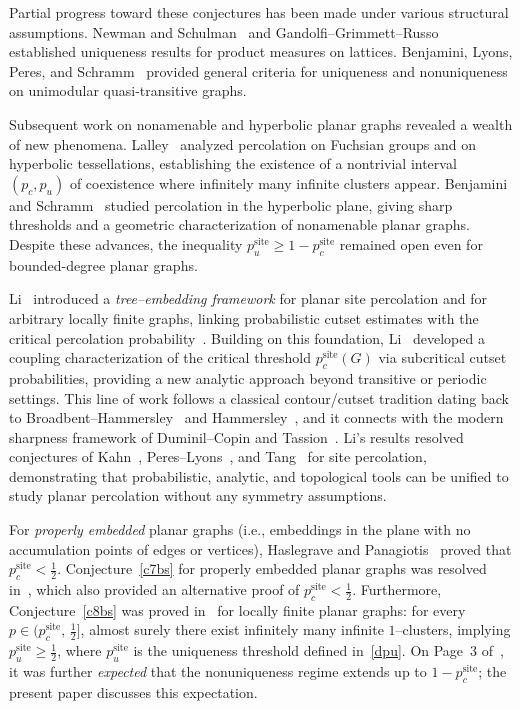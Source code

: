 \documentclass[11pt]{amsart}
\theoremstyle{plain}
\numberwithin{equation}{section}
\numberwithin{figure}{section}
\begin{document}
\medskip
Partial progress toward these conjectures has been made under various structural assumptions.
Newman and Schulman~\cite{NewmanSchulman1981}
and Gandolfi--Grimmett--Russo~\cite{GGR1988}
established uniqueness results for product measures on lattices.
Benjamini, Lyons, Peres, and Schramm~\cite{BLPS1999}
provided general criteria for uniqueness and nonuniqueness
on unimodular quasi-transitive graphs.

Subsequent work on nonamenable and hyperbolic planar graphs
revealed a wealth of new phenomena.
Lalley~\cite{SL98,SL01}
analyzed percolation on Fuchsian groups and on hyperbolic tessellations,
establishing the existence of a nontrivial interval
\((p_c,p_u)\) of coexistence where infinitely many infinite clusters appear.
 Benjamini and Schramm~\cite{BenjaminiSchramm2001}
studied percolation in the hyperbolic plane, giving sharp thresholds
and a geometric characterization of nonamenable planar graphs.
Despite these advances, the inequality
\(p_u^{\mathrm{site}} \ge 1 - p_c^{\mathrm{site}}\)
remained open even for bounded-degree planar graphs.


\medskip
Li~\cite{ZL231} introduced a \emph{tree--embedding framework}
for planar site percolation and for arbitrary locally finite graphs,
linking probabilistic cutset estimates with the critical percolation probability~\cite{ZL24}.
Building on this foundation,
Li~\cite{ZL24} developed a coupling characterization
of the critical threshold \(p_c^{\mathrm{site}}(G)\)
via subcritical cutset probabilities,
providing a new analytic approach beyond transitive or periodic settings.
This line of work follows a classical contour/cutset tradition
dating back to Broadbent--Hammersley~\cite{BH57} and Hammersley~\cite{HM57},
and it connects with the modern sharpness framework of
Duminil--Copin and Tassion~\cite{DCT16}.
Li’s results resolved conjectures of
Kahn~\cite{JK03}, Peres--Lyons~\cite{LP16}, and Tang~\cite{Tang2023}
for site percolation, demonstrating that probabilistic, analytic, and topological tools
can be unified to study planar percolation without any symmetry assumptions.

For \emph{properly embedded} planar graphs
(i.e., embeddings in the plane with no accumulation points of edges or vertices),
Haslegrave and Panagiotis~\cite{HP21} proved that \(p_c^{\mathrm{site}}<\tfrac12\).
Conjecture~\ref{c7bs}
for properly embedded planar graphs was resolved in~\cite{ZL231},
which also provided an alternative proof of \(p_c^{\mathrm{site}}<\tfrac12\).
Furthermore, Conjecture~\ref{c8bs} was proved in~\cite{GHZ25} for locally finite planar graphs:
for every \(p\in(p_c^{\mathrm{site}},\,\tfrac12]\),
almost surely there exist infinitely many infinite \(1\)--clusters,
implying \(p_u^{\mathrm{site}}\ge\tfrac12\),
where \(p_u^{\mathrm{site}}\) is the uniqueness threshold defined in~\eqref{dpu}.
On Page~3 of~\cite{bs96}, it was further \emph{expected} that
the nonuniqueness regime extends up to \(1-p_c^{\mathrm{site}}\);
the present paper discusses this expectation.
\end{document}

